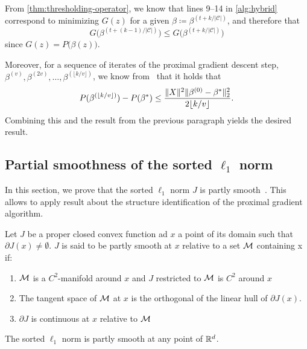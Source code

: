 From \cref{thm:thresholding-operator}, we know that lines 9--14 in \cref{alg:hybrid} correspond to minimizing \(G(z)\) for a given \(\beta \coloneqq \beta^{(t + k / |\mathcal{C}|)}\), and therefore that
\[
  G\big(\beta^{(t + (k - 1) / |\mathcal{C}|)}\big) \leq G\big(\beta^{(t + k / |\mathcal{C}|)}\big)
\]
since \(G(z) = P\big(\beta(z)\big)\).

Moreover, for a sequence of iterates of the proximal gradient descent step,
\(\beta^{(v)}, \beta^{(2v)}, \dots, \beta^{(\lfloor k / v \rfloor)}\),
we know from~\textcite[Theorem 3.1]{beck2009} that it holds that
\[
  P(\beta^{(\lfloor k / v \rfloor)}) - P(\beta^*)
  \leq \frac{\lVert {X} \rVert^2 \lVert \beta^{(0)} - \beta^* \rVert_2^2}{2\lfloor k / v \rfloor}.
\]
Combining this and the result from the previous paragraph yields the desired
result.



\subsection{Partial smoothness of the sorted $\ell_1$ norm}
\label{app:sec:partly_smooth}
In this section, we prove that the sorted $\ell_1$ norm $J$ is partly smooth~\parencite{lewis2003active}.
This allows to apply result about the structure identification of the proximal gradient algorithm.

\begin{definition}
  Let $J$ be a proper closed convex function ad $x$ a point of its domain such that $\partial J(x) \neq \emptyset$.
  $J$ is said to be partly smooth at $x$ relative to a set $\mathcal{M}$ containing x if:
  \begin{enumerate}
    \item $\mathcal{M}$ is a $C^2$-manifold around $x$ and $J$ restricted to $\mathcal{M}$ is $C^2$ around $x$
    \item The tangent space of $\mathcal{M}$ at $x$ is the orthogonal of the linear hull of $\partial J(x)$.
    \item $\partial J$ is continuous at $x$ relative to $\mathcal{M}$
  \end{enumerate}
\end{definition}

\begin{proposition}
  The sorted $\ell_1$ norm is partly smooth at any point of $\mathbb{R}^d$.
\end{proposition}

